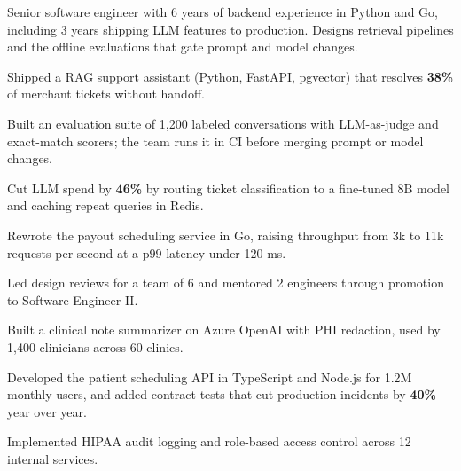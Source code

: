 

Senior software engineer with 6 years of backend experience in Python and Go,
including 3 years shipping LLM features to production. Designs retrieval pipelines
and the offline evaluations that gate prompt and model changes.

\begin{highlights}
  \item Shipped a RAG support assistant (Python, FastAPI, pgvector) that resolves
    \textbf{38\%} of merchant tickets without handoff.
  \item Built an evaluation suite of 1,200 labeled conversations with LLM-as-judge
    and exact-match scorers; the team runs it in CI before merging prompt or model changes.
  \item Cut LLM spend by \textbf{46\%} by routing ticket classification to a fine-tuned
    8B model and caching repeat queries in Redis.
  \item Rewrote the payout scheduling service in Go, raising throughput from 3k to
    11k requests per second at a p99 latency under 120 ms.
  \item Led design reviews for a team of 6 and mentored 2 engineers through
    promotion to Software Engineer II.
\end{highlights}

\begin{highlights}
  \item Built a clinical note summarizer on Azure OpenAI with PHI redaction, used by
    1,400 clinicians across 60 clinics.
  \item Developed the patient scheduling API in TypeScript and Node.js for 1.2M
    monthly users, and added contract tests that cut production incidents by
    \textbf{40\%} year over year.
  \item Implemented HIPAA audit logging and role-based access control across
    12 internal services.
\end{highlights}

